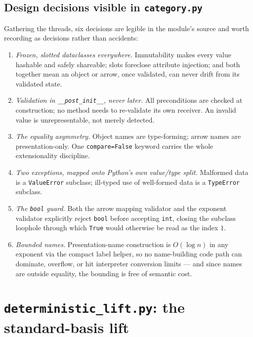 \subsection{Design decisions visible in \texttt{category.py}}\label{ch09:sec:cat-design}

Gathering the threads, six decisions are legible in the module's source and
worth recording as decisions rather than accidents:

\begin{enumerate}
\item \emph{Frozen, slotted dataclasses everywhere.} Immutability makes
      every value hashable and safely shareable; slots foreclose attribute
      injection; and both together mean an object or arrow, once
      validated, can never drift from its validated state.
\item \emph{Validation in \texttt{\_\_post\_init\_\_}, never later.} All
      preconditions are checked at construction; no method needs to
      re-validate its own receiver. An invalid value is unrepresentable,
      not merely detected.
\item \emph{The equality asymmetry.} Object names are type-forming; arrow
      names are presentation-only. One \texttt{compare=False} keyword
      carries the whole extensionality discipline.
\item \emph{Two exceptions, mapped onto Python's own value/type split.}
      Malformed data is a \texttt{ValueError} subclass; ill-typed use of
      well-formed data is a \texttt{TypeError} subclass.
\item \emph{The \texttt{bool} guard.} Both the arrow mapping validator and
      the exponent validator explicitly reject \texttt{bool} before
      accepting \texttt{int}, closing the subclass loophole through which
      \texttt{True} would otherwise be read as the index $1$.
\item \emph{Bounded names.} Presentation-name construction is $O(\log n)$
      in any exponent via the compact label helper, so no name-building
      code path can dominate, overflow, or hit interpreter conversion
      limits --- and since names are outside equality, the bounding is
      free of semantic cost.
\end{enumerate}

\section{\texttt{deterministic\_lift.py}: the standard-basis lift}\label{ch09:sec:lift}

